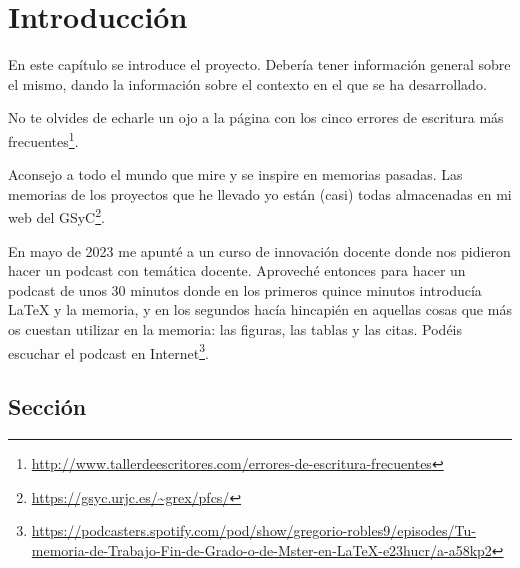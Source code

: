 \documentclass[a4paper, 12pt]{book}
\begin{document}
\tableofcontents 
\cleardoublepage
\listoffigures %



\cleardoublepage
\chapter{Introducción}
\label{sec:intro} %

En este capítulo se introduce el proyecto.
Debería tener información general sobre el mismo, dando la información sobre el contexto en el que se ha desarrollado.

No te olvides de echarle un ojo a la página con los cinco errores de escritura más frecuentes\footnote{\url{http://www.tallerdeescritores.com/errores-de-escritura-frecuentes}}.

Aconsejo a todo el mundo que mire y se inspire en memorias pasadas.
Las memorias de los proyectos que he llevado yo están (casi) todas almacenadas en mi web del GSyC\footnote{\url{https://gsyc.urjc.es/~grex/pfcs/}}.

En mayo de 2023 me apunté a un curso de innovación docente donde nos pidieron hacer un podcast con temática docente. Aproveché entonces para hacer un podcast de unos 30 minutos donde en los primeros quince minutos introducía LaTeX y la memoria, y en los segundos hacía hincapién en aquellas cosas que más os cuestan utilizar en la memoria: las figuras, las tablas y las citas. Podéis escuchar el podcast en Internet\footnote{\url{https://podcasters.spotify.com/pod/show/gregorio-robles9/episodes/Tu-memoria-de-Trabajo-Fin-de-Grado-o-de-Mster-en-LaTeX-e23hucr/a-a58kp2}}.


\section{Sección}
\label{sec:seccion}
\end{document}

